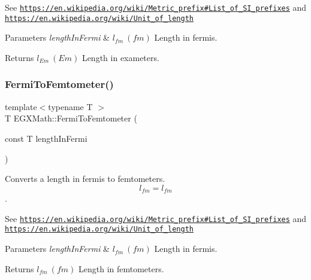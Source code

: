 See \href{https://en.wikipedia.org/wiki/Metric_prefix#List_of_SI_prefixes}{\tt https\+://en.\+wikipedia.\+org/wiki/\+Metric\+\_\+prefix\#\+List\+\_\+of\+\_\+\+S\+I\+\_\+prefixes} and \href{https://en.wikipedia.org/wiki/Unit_of_length}{\tt https\+://en.\+wikipedia.\+org/wiki/\+Unit\+\_\+of\+\_\+length} 
\begin{DoxyParams}{Parameters}
{\em length\+In\+Fermi} & $ l_{fm}\ (fm)$ Length in fermis. \\
\hline
\end{DoxyParams}
\begin{DoxyReturn}{Returns}
$ l_{Em}\ (Em)$ Length in exameters. 
\end{DoxyReturn}
\mbox{\label{group___e_g_x_math-_conversions-_length_conversions-_non-_s_i-_fermi-_s_i_ga79a9f408068ba1cbba8db425c8923340}} 
\subsubsection{\texorpdfstring{Fermi\+To\+Femtometer()}{FermiToFemtometer()}}
{\footnotesize\ttfamily template$<$typename T $>$ \\
T E\+G\+X\+Math\+::\+Fermi\+To\+Femtometer (\begin{DoxyParamCaption}\item[{const T}]{length\+In\+Fermi }\end{DoxyParamCaption})}



Converts a length in fermis to femtometers. \[ l_{fm}=l_{fm} \]. 

See \href{https://en.wikipedia.org/wiki/Metric_prefix#List_of_SI_prefixes}{\tt https\+://en.\+wikipedia.\+org/wiki/\+Metric\+\_\+prefix\#\+List\+\_\+of\+\_\+\+S\+I\+\_\+prefixes} and \href{https://en.wikipedia.org/wiki/Unit_of_length}{\tt https\+://en.\+wikipedia.\+org/wiki/\+Unit\+\_\+of\+\_\+length} 
\begin{DoxyParams}{Parameters}
{\em length\+In\+Fermi} & $ l_{fm}\ (fm)$ Length in fermis. \\
\hline
\end{DoxyParams}
\begin{DoxyReturn}{Returns}
$ l_{fm}\ (fm)$ Length in femtometers. 
\end{DoxyReturn}
\mbox{\label{group___e_g_x_math-_conversions-_length_conversions-_non-_s_i-_fermi-_s_i_gab1a1a212d0f0091293bc41c7c9cf5f41}} 
